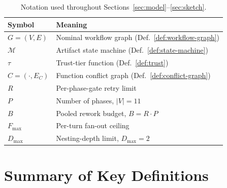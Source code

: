 \documentclass[12pt]{article}
\theoremstyle{definition}
\begin{document}
\begin{table}[H]
\centering
\caption{Notation used throughout Sections~\ref{sec:model}--\ref{sec:sketch}.}
\label{tab:notation}
\begin{tabular}{@{}ll@{}}
\toprule
\textbf{Symbol} & \textbf{Meaning} \\
\midrule
$G=(V,E)$ & Nominal workflow graph (Def.~\ref{def:workflow-graph}) \\
$\mathcal{M}$ & Artifact state machine (Def.~\ref{def:state-machine}) \\
$\tau$ & Trust-tier function (Def.~\ref{def:trust}) \\
$C=(\cdot,E_C)$ & Function conflict graph (Def.~\ref{def:conflict-graph}) \\
$R$ & Per-phase-gate retry limit \\
$P$ & Number of phases, $|V|=11$ \\
$B$ & Pooled rework budget, $B=R\cdot P$ \\
$F_{\max}$ & Per-turn fan-out ceiling \\
$D_{\max}$ & Nesting-depth limit, $D_{\max}=2$ \\
\bottomrule
\end{tabular}
\end{table}

\section{Summary of Key Definitions}
\label{app:key-defs}
\end{document}
